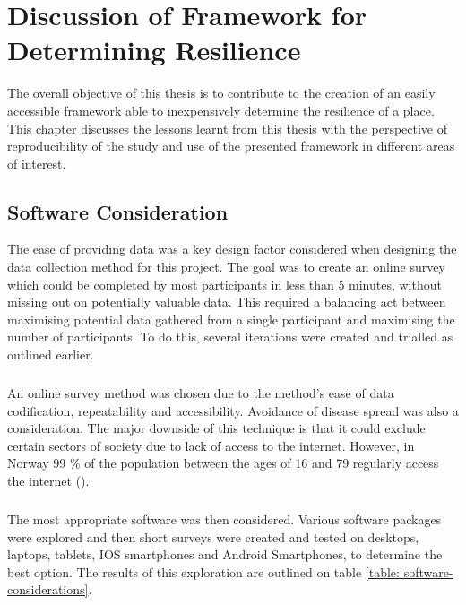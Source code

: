 \chapter{Discussion of Framework for Determining Resilience}

The overall objective of this thesis is to contribute to the creation of an easily accessible framework able to inexpensively determine the resilience of a place. This chapter discusses the lessons learnt from this thesis with the perspective of reproducibility of the study and use of the presented framework in different areas of interest.

\section{Software Consideration}
The ease of providing data was a key design factor considered when designing the data collection method for this project. The goal was to create an online survey which could be completed by most participants in less than 5 minutes, without missing out on potentially valuable data. This required a balancing act between maximising potential data gathered from a single participant and maximising the number of participants. To do this, several iterations were created and trialled as outlined earlier.
\paragraph{}
An online survey method was chosen due to the method's ease of data codification, repeatability and accessibility. Avoidance of disease spread was also a consideration. The major downside of this technique is that it could exclude certain sectors of society due to lack of access to the internet. However, in Norway 99 \% of the population between the ages of 16 and 79 regularly access the internet (\cite{walther-zhang_ict_2022}). 
\paragraph{}
The most appropriate software was then considered.  Various software packages were explored and then short surveys were created and  tested on desktops, laptops, tablets, IOS smartphones and Android Smartphones, to determine the best option. The results of this exploration are outlined on table \ref{table: software-considerations}.

